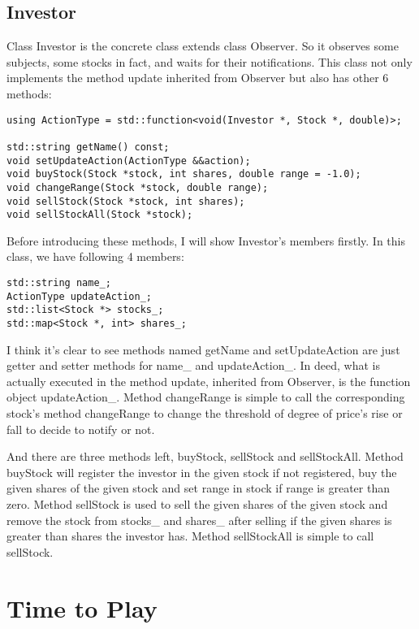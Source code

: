 \documentclass{article}
\begin{document}
\subsection{Investor}

    Class Investor is the concrete class extends class Observer. So it observes some subjects, some stocks in fact, and waits for their notifications. This class not only implements the method update inherited from Observer but also has other 6 methods:
    
\begin{lstlisting}
using ActionType = std::function<void(Investor *, Stock *, double)>;

std::string getName() const;
void setUpdateAction(ActionType &&action);
void buyStock(Stock *stock, int shares, double range = -1.0);
void changeRange(Stock *stock, double range);
void sellStock(Stock *stock, int shares);
void sellStockAll(Stock *stock);
\end{lstlisting}

    Before introducing these methods, I will show Investor's members firstly. In this class, we have following 4 members:
    
\begin{lstlisting}
std::string name_;
ActionType updateAction_;
std::list<Stock *> stocks_;
std::map<Stock *, int> shares_;
\end{lstlisting}

    I think it's clear to see methods named getName and setUpdateAction are just getter and setter methods for name\_ and updateAction\_. In deed, what is actually executed in the method update, inherited from Observer, is the function object updateAction\_. Method changeRange is simple to call the corresponding stock's method changeRange to change the threshold of degree of price's rise or fall to decide to notify or not.
    
    And there are three methods left, buyStock, sellStock and sellStockAll. Method buyStock will register the investor in the given stock if not registered, buy the given shares of the given stock and set range in stock if range is greater than zero. Method sellStock is used to sell the given shares of the given stock and remove the stock from stocks\_ and shares\_ after selling if the given shares is greater than shares the investor has. Method sellStockAll is simple to call sellStock.

\section{Time to Play}
\end{document}
